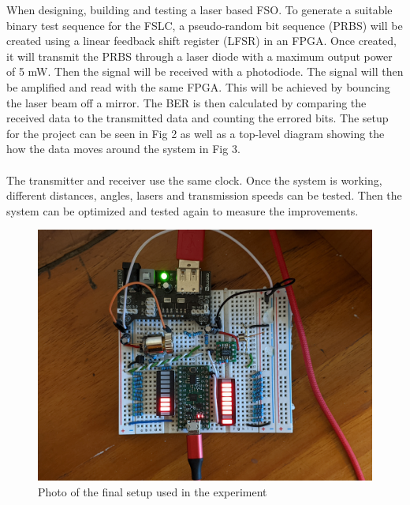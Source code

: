 \documentclass[conference]{IEEEtran}
\begin{document}
When designing, building and testing a laser based FSO. To generate a suitable binary test sequence for the FSLC, a pseudo-random bit sequence (PRBS) will be created using a linear feedback shift register (LFSR) in an FPGA. Once created, it will transmit the PRBS through a laser diode with a maximum output power of 5 mW. Then the signal will be received with a photodiode. The signal will then be amplified and read with the same FPGA. This will be achieved by bouncing the laser beam off a mirror. The BER is then calculated by comparing the received data to the transmitted data and counting the errored bits. The setup for the project can be seen in Fig 2 as well as a top-level diagram showing the how the data moves around the system in Fig 3.
\\\\
The transmitter and receiver use the same clock. Once the system is working, different distances, angles, lasers and transmission speeds can be tested. Then the system can be optimized and tested again to measure the improvements.

\begin{figure}[h]
\includegraphics[width=\linewidth]{fig 2.jpg}\par
\caption{Photo of the final setup used in the experiment}
\label{fig}
\end{figure}
\end{document}
